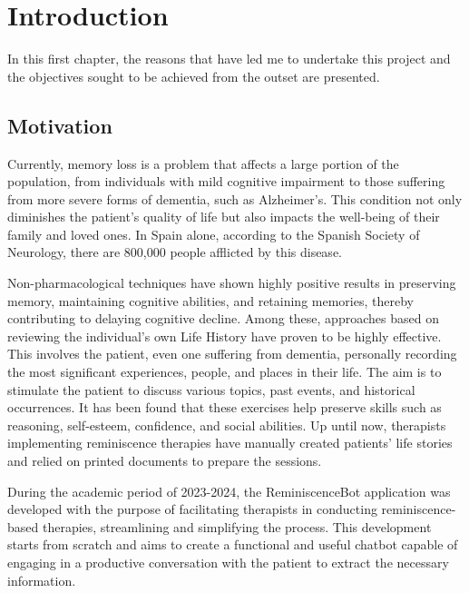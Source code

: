 \chapter*{Introduction}
\label{cap:introduction}

In this first chapter, the reasons that have led me to undertake this project and the objectives sought to be achieved from the outset are presented.


\section{Motivation}
Currently, memory loss is a problem that affects a large portion of the population, from individuals with mild cognitive impairment to those suffering from more severe forms of dementia, such as Alzheimer's. This condition not only diminishes the patient's quality of life but also impacts the well-being of their family and loved ones. In Spain alone, according to the Spanish Society of Neurology, there are 800,000 people afflicted by this disease.

Non-pharmacological techniques have shown highly positive results in preserving memory, maintaining cognitive abilities, and retaining memories, thereby contributing to delaying cognitive decline. Among these, approaches based on reviewing the individual's own Life History have proven to be highly effective. This involves the patient, even one suffering from dementia, personally recording the most significant experiences, people, and places in their life. The aim is to stimulate the patient to discuss various topics, past events, and historical occurrences. It has been found that these exercises help preserve skills such as reasoning, self-esteem, confidence, and social abilities. Up until now, therapists implementing reminiscence therapies have manually created patients' life stories and relied on printed documents to prepare the sessions.

During the academic period of 2023-2024, the ReminiscenceBot application was developed with the purpose of facilitating therapists in conducting reminiscence-based therapies, streamlining and simplifying the process. This development starts from scratch and aims to create a functional and useful chatbot capable of engaging in a productive conversation with the patient to extract the necessary information.


